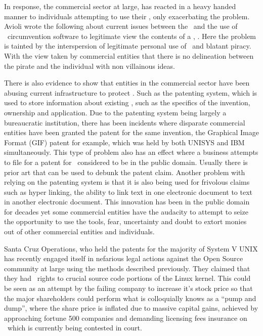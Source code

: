 In response, the commercial sector at large, has reacted in a heavy handed manner to individuals attempting to use their \IP, only exacerbating the problem. Avioli wrote the following about current issues between the \MPAA\ and the use of \CSS\ circumvention software to legitimate view the contents of a \DVD, . Here the problem is tainted by the interspersion of legitimate personal use of \IP\ and blatant piracy. With the view taken by commercial entities that there is no delineation between the pirate and the individual with non villainous ideas.

There is also evidence to show that entities in the commercial sector have been abusing current infrastructure to protect \IP. Such as the patenting system, which is used to store information about existing \IP, such as the specifics of the invention, ownership and application. Due to the patenting system being largely a bureaucratic institution, there has been incidents where disparate commercial entities have been granted the patent for the same invention, the Graphical Image Format (GIF) patent for example, which was held by both UNISYS and IBM simultaneously. This type of problem also has an effect where a business attempts to file for a patent for \IP\ considered to be in the public domain. Usually there is prior art that can be used to debunk the patent claim. Another problem with relying on the patenting system is that it is also being used for frivolous claims such as hyper linking, the ability to link text in one electronic document to text in another electronic document. This innovation has been in the public domain for decades yet some commercial entities have the audacity to attempt to seize the opportunity to use the tools, fear, uncertainty and doubt to extort monies out of other commercial entities and individuals.

Santa Cruz Operations, who held the patents for the majority of System V UNIX has recently engaged itself in nefarious legal actions against the Open Source community at large using the methods described previously. They claimed that they had \IP\ rights to crucial source code portions of the Linux kernel. This could be seen as an attempt by the failing company to increase it's stock price so that the major shareholders could perform what is colloquially knows as a ``pump and dump'', where the share price is inflated due to massive capital gains, achieved by approaching fortune 500 companies and demanding licensing fees insurance on \IP\ which is currently being contested in court.

